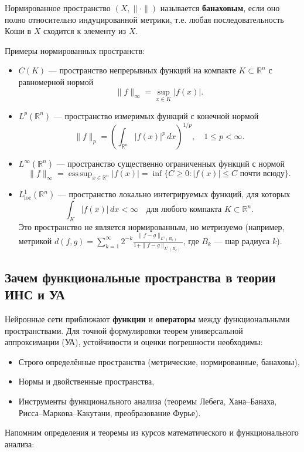 \documentclass[../NDCNNAI_main.tex]{subfiles}
\begin{document}
\begin{definition}
    Нормированное пространство \( (X, \|\cdot\|) \) называется \textbf{банаховым}, если оно полно относительно индуцированной метрики, т.е. любая последовательность Коши в \( X \) сходится к элементу из \( X \).
\end{definition}
Примеры нормированных пространств:
    \begin{itemize}
        \item \( C(K) \) --- пространство непрерывных функций на компакте \( K \subset \mathbb{R}^n \) с равномерной нормой
              \[ \|f\|_\infty = \sup_{x \in K} |f(x)|. \]
        \item \( L^p(\mathbb{R}^n) \) --- пространство измеримых функций с конечной нормой
              \[ \|f\|_p = \left( \int_{\mathbb{R}^n} |f(x)|^p \, dx \right)^{1/p}, \quad 1 \le p < \infty. \]
        \item \( L^\infty(\mathbb{R}^n) \) --- пространство существенно ограниченных функций с нормой
              \[ \|f\|_\infty = \operatorname{ess\,sup}_{x \in \mathbb{R}^n} |f(x)| = \inf\{ C \ge 0 : |f(x)| \le C \text{ почти всюду} \}. \]
        \item \( L^1_{\text{loc}}(\mathbb{R}^n) \) --- пространство локально интегрируемых функций, для которых
              \[ \int_K |f(x)| \, dx < \infty \quad \text{для любого компакта } K \subset \mathbb{R}^n. \]
              Это пространство не является нормированным, но метризуемо (например, метрикой \( d(f,g) = \sum_{k=1}^\infty 2^{-k} \frac{\|f-g\|_{L^1(B_k)}}{1+\|f-g\|_{L^1(B_k)}} \), где \( B_k \) --- шар радиуса \( k \)).
    \end{itemize}


\subsection{Зачем функциональные пространства в теории ИНС и УА}

Нейронные сети приближают \textbf{функции} и \textbf{операторы} между функциональными пространствами. Для точной формулировки теорем универсальной аппроксимации (УА), устойчивости и оценки погрешности необходимы:

\begin{itemize}
    \item Строго определённые пространства (метрические, нормированные, банаховы),
    \item Нормы и двойственные пространства,
    \item Инструменты функционального анализа (теоремы Лебега, Хана–Банаха, \\
    Рисса–Маркова–Какутани, преобразование Фурье).
\end{itemize}
Напомним определения и теоремы из курсов математического и функционального анализа:
\end{document}
